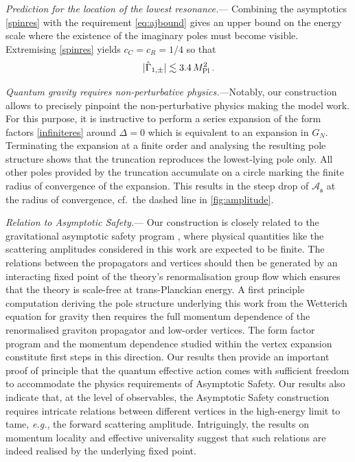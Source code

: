 \documentclass[aps,prl,onecolumn,superscriptaddress,longbibliography,nofootinbib,floatfix,showpacs,12pt]{revtex4-1}
\newcommand{\cA}{{\mathcal A}}
\newcommand{\eg}{{\textit{e.g.}}}
\newcommand{\be}{\begin{equation}}
\newcommand{\ee}{\end{equation}}
\newcommand{\mans}{\ensuremath{\mathfrak{s}}}
\newcommand{\ressym}{\hat{\Gamma}}
\begin{document}
\textit{Prediction for the location of the lowest resonance.}---
Combining the asymptotics \eqref{spinres} with the requirement \eqref{eq:ajbound} gives an upper bound on the energy scale where the existence of the imaginary poles must become visible.
Extremising \eqref{spinres} yields $c_C = c_R = 1/4$ so that
%
\be
|\ressym_{1,\pm}| \lesssim  3.4 \, M_{\rm Pl}^2 \, .
\ee
%

\textit{Quantum gravity requires non-perturbative physics.}---Notably, our construction allows to precisely pinpoint the non-perturbative physics making the model work.
For this purpose, it is instructive to perform a series expansion of the form factors \eqref{infiniteres} around $\Delta = 0$ which is equivalent to an expansion in $G_N$.
Terminating the expansion at a finite order and analysing the resulting pole structure shows  that the truncation reproduces the lowest-lying pole only.
All other poles provided by the truncation accumulate on a circle marking the finite radius of convergence of the expansion. This results in  the steep drop of $\cA_\mans$ at the radius of convergence, cf.\ the dashed line in \autoref{fig:amplitude}. 

\textit{Relation to Asymptotic Safety.}---
Our construction is closely related to the gravitational asymptotic safety program \cite{Weinberg:1976xy,Weinberg:1980gg}, where physical quantities like the scattering amplitudes considered in this work are expected to be finite.
The relations between the propagators and vertices should then be generated by an interacting fixed point of the theory's renormalisation group flow which ensures that the theory is scale-free at trans-Planckian energy.
A first principle computation deriving the pole structure underlying this work from the Wetterich equation for gravity \cite{Reuter:1996cp} then requires the full momentum dependence of the renormalised graviton propagator and low-order vertices.
The form factor program  \cite{Becker:2017tcx,Bosma:2019aiu,Knorr:2019atm} and the momentum dependence studied within the vertex expansion \cite{Christiansen:2014raa,Christiansen:2015rva,Meibohm:2015twa,Denz:2016qks,Christiansen:2017cxa,Eichhorn:2018ydy,Reichert:2020mja} constitute first steps in this direction.
Our results then provide an important proof of principle that the quantum effective action comes with sufficient freedom to accommodate the physics requirements of Asymptotic Safety.
Our results also indicate that, at the level of observables, the Asymptotic Safety construction requires intricate relations between different vertices in the high-energy limit to tame, \eg, the forward scattering amplitude.
Intriguingly, the results on momentum locality \cite{Christiansen:2015rva, Denz:2016qks} and effective universality \cite{Eichhorn:2018akn, Eichhorn:2018ydy, Meibohm:2015twa, Dona:2015tnf, Eichhorn:2017sok, Christiansen:2017cxa, Eichhorn:2018nda} suggest that such relations  are indeed realised by the underlying fixed point.
\end{document}
